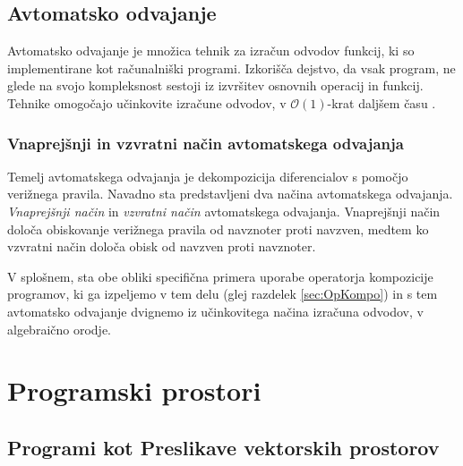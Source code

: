 \documentclass[a4paper, 12pt]{book}
\begin{document}
\section{Avtomatsko odvajanje}\label{sec:avtOdv}

Avtomatsko odvajanje je množica tehnik za izračun odvodov funkcij, ki so implementirane kot računalniški programi. Izkorišča dejstvo, da vsak program, ne glede na svojo kompleksnost sestoji iz izvršitev osnovnih operacij in funkcij. Tehnike omogočajo učinkovite izračune odvodov, v $\mathcal{O}(1)$-krat daljšem času \cite{AdSurvey}.

\subsection{Vnaprejšnji in vzvratni način avtomatskega odvajanja}

Temelj avtomatskega odvajanja je dekompozicija diferencialov s pomočjo verižnega pravila. Navadno sta predstavljeni dva načina avtomatskega odvajanja. \emph{Vnaprejšnji način} \cite{PcAD} in \emph{vzvratni način} \cite{ReverseAD} avtomatskega odvajanja. Vnaprejšnji način določa obiskovanje verižnega pravila od navznoter proti navzven, medtem ko vzvratni način določa obisk od navzven proti navznoter.

V splošnem, sta obe obliki specifična primera uporabe operatorja kompozicije programov, ki ga izpeljemo v tem delu (glej razdelek \ref{sec:OpKompo}) in s tem avtomatsko odvajanje dvignemo iz učinkovitega načina izračuna odvodov, v algebraično orodje.

\chapter{Programski prostori} \label{ch:programskiProstori}

\section{Programi kot Preslikave vektorskih prostorov}\label{sec:progKotPres}
\end{document}
